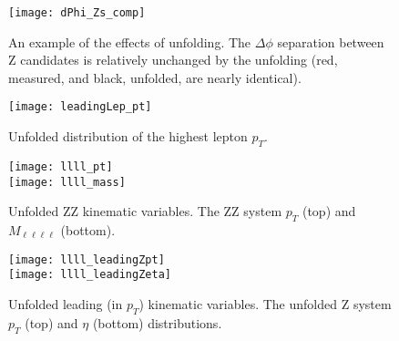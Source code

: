 
\begin{figure}[h]
\centering
\texttt{[image: dPhi\_Zs\_comp]}
\caption[An example of the effects of unfolding.]{An example of the effects of
    unfolding. The $\Delta \phi$ separation between Z candidates is relatively
    unchanged by the unfolding (red, measured, and black, unfolded, are nearly
    identical).}
\label{fig:unfoldedExample}
\end{figure}

\begin{figure}[h]
\centering
\texttt{[image: leadingLep\_pt]}
\caption[Unfolded distribution of the highest $p_T$ lepton.]{Unfolded
distribution of the highest lepton $p_T$.}
\label{fig:unfolding_leadingLepPt}
\end{figure}

\begin{figure}[h]
\centering
\texttt{[image: llll\_pt]} \\
\texttt{[image: llll\_mass]}
\caption[Unfolded ZZ kinematic variables.]{Unfolded ZZ kinematic variables. The
ZZ system $p_{T}$ (top) and $M_{\ell\ell\ell\ell}$ (bottom).}
\label{fig:unfolding_ZZ}
\end{figure}

\begin{figure}[h]
\centering
\texttt{[image: llll\_leadingZpt]} \\ 
\texttt{[image: llll\_leadingZeta]}
\caption[Unfolded leading (in $p_T$) Z kinematic variables.]{Unfolded leading (in
$p_T$) kinematic variables. The unfolded
Z system $p_{T}$ (top) and $\eta$ (bottom) distributions.}
\label{fig:unfolding_Z1}
\end{figure}

